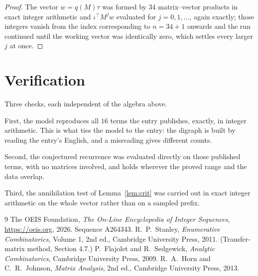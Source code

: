\documentclass[11pt,a4paper]{article}
\theoremstyle{plain}
\theoremstyle{definition}
\begin{document}
\begin{proof}
The vector $w=q(M)\tau$ was formed by $34$ matrix--vector products in exact integer
arithmetic and $\iota^{\!\top}M^{j}w$ evaluated for $j=0,1,\dots$, again exactly; those
integers vanish from the index corresponding to $n=34+1$ onwards and the run continued
until the working vector was identically zero, which settles every larger $j$ at once.
\end{proof}

\section{Verification}

Three checks, each independent of the algebra above.

First, the model reproduces all $16$ terms the entry publishes, exactly, in integer
arithmetic. This is what ties the model to the entry: the digraph is built by reading the
entry's English, and a misreading gives different counts.

Second, the conjectured recurrence was evaluated directly on those published terms, with no
matrices involved, and holds wherever the proved range and the data overlap.

Third, the annihilation test of Lemma~\ref{lem:crit} was carried out in exact integer
arithmetic on the whole vector rather than on a sampled prefix.

\begin{thebibliography}{9}
 The OEIS Foundation, \emph{The On-Line Encyclopedia of Integer
Sequences}, \url{https://oeis.org}, 2026. Sequence A264343.
 R.~P.~Stanley, \emph{Enumerative Combinatorics}, Volume 1, 2nd ed.,
Cambridge University Press, 2011. (Transfer-matrix method, Section 4.7.)
 P.~Flajolet and R.~Sedgewick, \emph{Analytic Combinatorics}, Cambridge
University Press, 2009.
 R.~A.~Horn and C.~R.~Johnson, \emph{Matrix Analysis}, 2nd ed., Cambridge
University Press, 2013.
\end{thebibliography}
\end{document}
